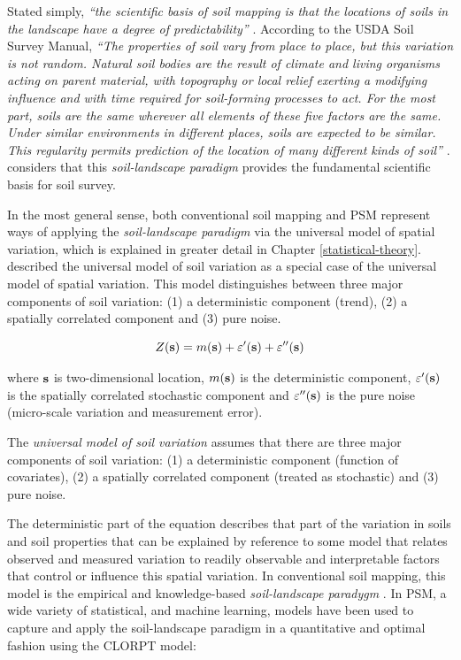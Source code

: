 \documentclass[graybox,natbib,nospthms,UStrade]{svmono}
\let\BeginKnitrBlock\begin \let\EndKnitrBlock\end
\let\BeginKnitrBlock\begin \let\EndKnitrBlock\end
\begin{document}
Stated simply, \emph{``the scientific basis of soil mapping is that the
locations of soils in the landscape have a degree of predictability''}
\citep{Miller1979}. According to the USDA Soil Survey Manual, \emph{``The
properties of soil vary from place to place, but this variation is not
random. Natural soil bodies are the result of climate and living
organisms acting on parent material, with topography or local relief
exerting a modifying influence and with time required for soil-forming
processes to act. For the most part, soils are the same wherever all
elements of these five factors are the same. Under similar environments in
different places, soils are expected to be similar. This regularity permits prediction
of the location of many different kinds of soil''} \citep{SSDS1993}.
\citet{Hudson2000SSSAJ} considers that this \emph{soil-landscape paradigm} provides
the fundamental scientific basis for soil survey.

In the most general sense, both conventional soil mapping and PSM
represent ways of applying the \emph{soil-landscape paradigm} via the universal model of spatial
variation, which is explained in greater detail in
Chapter \ref{statistical-theory}. \citet[p.133]{Burrough1998OUP} described the
universal model of soil variation as a special case of the universal
model of spatial variation. This model distinguishes between three major
components of soil variation: (1) a deterministic component (trend), (2)
a spatially correlated component and (3) pure noise.

\begin{equation}
Z({\bf{s}}) = m({\bf{s}}) + \varepsilon '({\bf{s}}) + \varepsilon ''({\bf{s}})
\label{eq:univ-var}
\end{equation}

where \(\bf{s}\) is two-dimensional location, \(m({\bf{s}})\) is the
deterministic component, \(\varepsilon '({\bf{s}})\) is the spatially
correlated stochastic component and \(\varepsilon ''({\bf{s}})\) is the
pure noise (micro-scale variation and measurement error).

\BeginKnitrBlock{rmdnote}
The \emph{universal model of soil variation} assumes that
there are three major components of soil variation: (1) a
deterministic component (function of covariates), (2) a spatially
correlated component (treated as stochastic) and (3) pure noise.
\EndKnitrBlock{rmdnote}

The deterministic part of the equation describes that part of the
variation in soils and soil properties that can be explained by
reference to some model that relates observed and measured variation to
readily observable and interpretable factors that control or influence
this spatial variation. In conventional soil mapping, this model is the
empirical and knowledge-based \emph{soil-landscape paradygm}
\citep{Hudson2000SSSAJ}. In PSM, a wide variety of statistical, and machine learning,
models have been used to capture and apply the soil-landscape paradigm
in a quantitative and optimal fashion using the CLORPT model:
\end{document}
